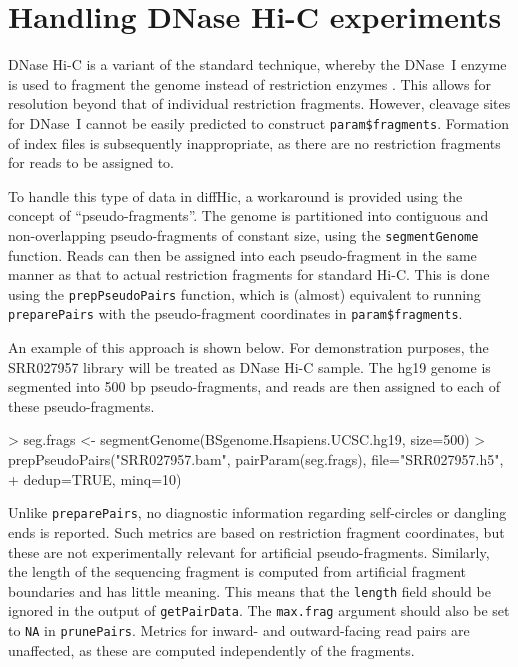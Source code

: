 \documentclass[12pt]{report}
\renewenvironment{Schunk}{\vspace{0pt}}{\vspace{0pt}}
\newcommand{\pkgname}{diffHic}
\newcommand{\code}[1]{{\small\texttt{#1}}}
\begin{document}
\section{Handling DNase Hi-C experiments}
DNase Hi-C is a variant of the standard technique, whereby the DNase~I enzyme is used to fragment the genome instead of restriction enzymes \citep{ma2015dnase}.
This allows for resolution beyond that of individual restriction fragments.
However, cleavage sites for DNase~I cannot be easily predicted to construct \code{param\$fragments}.
Formation of index files is subsequently inappropriate, as there are no restriction fragments for reads to be assigned to.

To handle this type of data in \pkgname{}, a workaround is provided using the concept of ``pseudo-fragments''.
The genome is partitioned into contiguous and non-overlapping pseudo-fragments of constant size, using the \code{segmentGenome} function.
Reads can then be assigned into each pseudo-fragment in the same manner as that to actual restriction fragments for standard Hi-C.
This is done using the \code{prepPseudoPairs} function, which is (almost) equivalent to running \code{preparePairs} with the pseudo-fragment coordinates in \code{param\$fragments}.

An example of this approach is shown below.
For demonstration purposes, the SRR027957 library will be treated as DNase Hi-C sample.
The hg19 genome is segmented into 500 bp pseudo-fragments, and reads are then assigned to each of these pseudo-fragments.

\begin{Schunk}
\begin{Sinput}
> seg.frags <- segmentGenome(BSgenome.Hsapiens.UCSC.hg19, size=500)
> prepPseudoPairs("SRR027957.bam", pairParam(seg.frags), file="SRR027957.h5", 
+     dedup=TRUE, minq=10)
\end{Sinput}
\end{Schunk}

Unlike \code{preparePairs}, no diagnostic information regarding self-circles or dangling ends is reported.
Such metrics are based on restriction fragment coordinates, but these are not experimentally relevant for artificial pseudo-fragments.
Similarly, the length of the sequencing fragment is computed from artificial fragment boundaries and has little meaning.
This means that the \code{length} field should be ignored in the output of \code{getPairData}.
The \code{max.frag} argument should also be set to \code{NA} in \code{prunePairs}.
Metrics for inward- and outward-facing read pairs are unaffected, as these are computed independently of the fragments.
\end{document}
